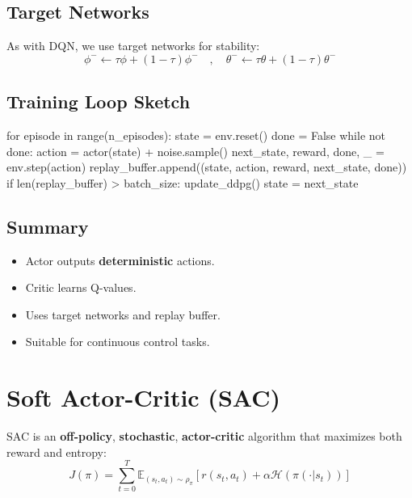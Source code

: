 \documentclass{article}
\begin{document}
\subsection{Target Networks}

As with DQN, we use target networks for stability:
\begin{equation}
    \phi^- \leftarrow \tau \phi + (1 - \tau)\phi^- \quad,\quad \theta^- \leftarrow \tau \theta + (1 - \tau)\theta^-
\end{equation}

\subsection{Training Loop Sketch}

\begin{python}
for episode in range(n_episodes):
    state = env.reset()
    done = False
    while not done:
        action = actor(state) + noise.sample()
        next_state, reward, done, _ = env.step(action)
        replay_buffer.append((state, action, reward, next_state, done))
        if len(replay_buffer) > batch_size:
            update_ddpg()
        state = next_state
\end{python}

\subsection{Summary}

\begin{itemize}
    \item Actor outputs \textbf{deterministic} actions.
    \item Critic learns Q-values.
    \item Uses target networks and replay buffer.
    \item Suitable for continuous control tasks.
\end{itemize}

\section{Soft Actor-Critic (SAC)}

SAC is an \textbf{off-policy}, \textbf{stochastic}, \textbf{actor-critic} algorithm that maximizes both reward and entropy:
\begin{equation}
    J(\pi) = \sum_{t=0}^{T} \mathbb{E}_{(s_t, a_t) \sim \rho_\pi} \left[ r(s_t, a_t) + \alpha \mathcal{H}(\pi(\cdot|s_t)) \right]
\end{equation}
\end{document}
